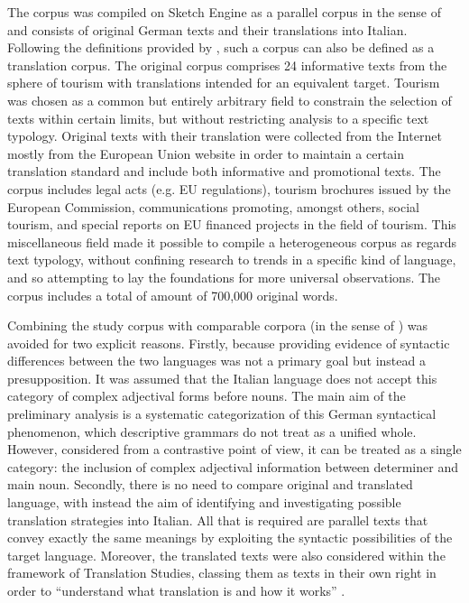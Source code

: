 \documentclass[output=paper,colorlinks,citecolor=brown]{langscibook}
\begin{document}
The corpus was compiled on Sketch Engine \citep{KilgariffEtAl2004} as a parallel corpus in the sense of \citet[37]{Hartmann1980} and consists of original German texts and their translations into Italian. Following the definitions provided by \citet[19]{Granger2003}, such a corpus can also be defined as a translation corpus. The original corpus comprises 24 informative texts from the sphere of tourism with translations intended for an equivalent target. Tourism was chosen as a common but entirely arbitrary field to constrain the selection of texts within certain limits, but without restricting analysis to a specific text typology. Original texts with their translation were collected from the Internet mostly from the European Union website in order to maintain a certain translation standard and include both informative and promotional texts. The corpus includes legal acts (e.g. EU regulations), tourism brochures issued by the European Commission, communications promoting, amongst others, social tourism, and special reports on EU financed projects in the field of tourism. This miscellaneous field made it possible to compile a heterogeneous corpus as regards text typology, without confining research to trends in a specific kind of language, and so attempting to lay the foundations for more universal observations. The corpus includes a total of amount of 700,000 original words.

Combining the study corpus with comparable corpora (in the sense of \citealt{JohanssonHasselgard1999}) was avoided for two explicit reasons. Firstly, because providing evidence of syntactic differences between the two languages was not a primary goal but instead a presupposition. It was assumed that the Italian language does not accept this category of complex adjectival forms before nouns. The main aim of the preliminary analysis is a systematic categorization of this German syntactical phenomenon, which descriptive grammars do not treat as a unified whole. However, considered from a contrastive point of view, it can be treated as a single category: the inclusion of complex adjectival information between determiner and main noun. Secondly, there is no need to compare original and translated language, with instead the aim of identifying and investigating possible translation strategies into Italian. All that is required are parallel texts that convey exactly the same meanings by exploiting the syntactic possibilities of the target language. Moreover, the translated texts were also considered within the framework of Translation Studies, classing them as texts in their own right in order to “understand what translation is and how it works” \citep[243]{Baker1993}.
\end{document}
